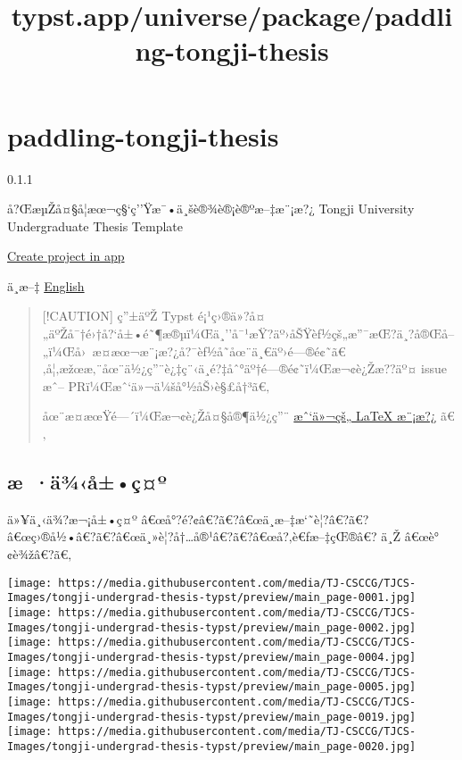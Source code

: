 \title{typst.app/universe/package/paddling-tongji-thesis}

\label{banner}
\label{template-thumbnail}

\section{paddling-tongji-thesis}\label{paddling-tongji-thesis}

{ 0.1.1 }

å?ŒæµŽå¤§å­¦æœ¬ç§`ç''Ÿæ¯•ä¸šè®¾è®¡è®ºæ--‡æ¨¡æ?¿ \textbar{} Tongji
University Undergraduate Thesis Template

\href{/app?template=paddling-tongji-thesis&version=0.1.1}{Create project
in app}

\label{readme}
ä¸­æ--‡ \textbar{}
\href{https://github.com/typst/packages/raw/main/packages/preview/paddling-tongji-thesis/0.1.1/README-EN.md}{English}

\begin{quote}
{[}!CAUTION{]} ç''±äºŽ Typst
é¡¹ç›®ä»?å¤„äºŽå¯†é›†å?{}`å±•é˜¶æ®µï¼Œä¸''å¯¹æŸ?äº›åŠŸèƒ½çš„æ''¯æŒ?ä¸?å®Œå--„ï¼Œå›~æ­¤æœ¬æ¨¡æ?¿å?¯èƒ½å­˜åœ¨ä¸€äº›é---®é¢˜ã€‚å¦‚æžœæ‚¨åœ¨ä½¿ç''¨è¿‡ç¨‹ä¸­é?‡åˆ°äº†é---®é¢˜ï¼Œæ¬¢è¿Žæ??äº¤
issue æˆ-- PRï¼Œæˆ`ä»¬ä¼šå°½åŠ›è§£å†³ã€‚

åœ¨æ­¤æœŸé---´ï¼Œæ¬¢è¿Žå¤§å®¶ä½¿ç''¨
\href{https://github.com/TJ-CSCCG/tongji-undergrad-thesis}{æˆ`ä»¬çš„
LaTeX æ¨¡æ?¿} ã€‚
\end{quote}

\subsection{æ~·ä¾‹å±•ç¤º}\label{uxe6-uxe4uxbeuxe5uxe7uxba}

ä»¥ä¸‹ä¾?æ¬¡å±•ç¤º
â€œå°?é?¢â€?ã€?â€œä¸­æ--‡æ`˜è¦?â€?ã€?â€œç›®å½•â€?ã€?â€œä¸»è¦?å†\ldots å®¹â€?ã€?â€œå?‚è€ƒæ--‡çŒ®â€?
ä¸Ž â€œè°¢è¾žâ€?ã€‚

\texttt{[image: https://media.githubusercontent.com/media/TJ-CSCCG/TJCS-Images/tongji-undergrad-thesis-typst/preview/main\_page-0001.jpg]}
\texttt{[image: https://media.githubusercontent.com/media/TJ-CSCCG/TJCS-Images/tongji-undergrad-thesis-typst/preview/main\_page-0002.jpg]}
\texttt{[image: https://media.githubusercontent.com/media/TJ-CSCCG/TJCS-Images/tongji-undergrad-thesis-typst/preview/main\_page-0004.jpg]}
\texttt{[image: https://media.githubusercontent.com/media/TJ-CSCCG/TJCS-Images/tongji-undergrad-thesis-typst/preview/main\_page-0005.jpg]}
\texttt{[image: https://media.githubusercontent.com/media/TJ-CSCCG/TJCS-Images/tongji-undergrad-thesis-typst/preview/main\_page-0019.jpg]}
\texttt{[image: https://media.githubusercontent.com/media/TJ-CSCCG/TJCS-Images/tongji-undergrad-thesis-typst/preview/main\_page-0020.jpg]}

